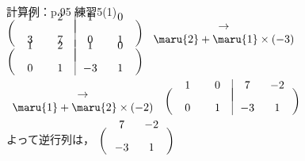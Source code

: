 \documentclass[a4paper,10pt,onecolumn,oneside,notitlepage,final]{jsarticle} %
\begin{document}
\large

計算例：p.95 練習5(1)\\%

$\left(\begin{array}{cc|cc}
\hspace{6mm}&\hspace{6mm}&\hspace{6mm}&\hspace{6mm}\\[-7mm]
   1&   2&   1&   0\\[3mm]
   3&   7&   0&   1\\
\end{array}\right)$
$\begin{array}{ll}
\hfill\to\hfill\\
\maru{2}+\maru{1}\times(-3)\\
\end{array}$
$\left(\begin{array}{cc|cc}
\hspace{6mm}&\hspace{6mm}&\hspace{6mm}&\hspace{6mm}\\[-7mm]
   1&   2&   1&   0\\[3mm]
   0&   1&  -3&   1\\
\end{array}\right)$

$\begin{array}{ll}
\hfill\to\hfill\\
\maru{1}+\maru{2}\times(-2)\\
\end{array}$
$\left(\begin{array}{cc|cc}
\hspace{6mm}&\hspace{6mm}&\hspace{6mm}&\hspace{6mm}\\[-7mm]
   1&   0&   7&  -2\\[3mm]
   0&   1&  -3&   1\\
\end{array}\right)$

よって逆行列は，
$\left(\begin{array}{cc}
\hspace{6mm}&\hspace{6mm}\\[-7mm]
   7&  -2\\[3mm]
  -3&   1\\
\end{array}\right)$
\end{document}
